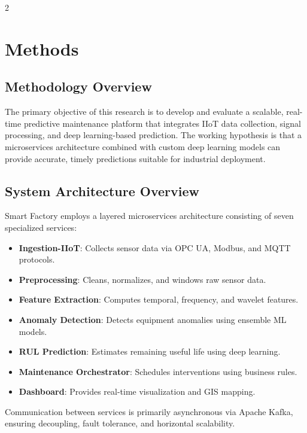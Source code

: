 \documentclass{ijceds} %
\begin{document}
\begin{multicols}{2}


\section{Methods}
\label{sec:methods}

\subsection{Methodology Overview}

The primary objective of this research is to develop and evaluate a scalable, real-time predictive maintenance platform that integrates IIoT data collection, signal processing, and deep learning-based prediction. The working hypothesis is that a microservices architecture combined with custom deep learning models can provide accurate, timely predictions suitable for industrial deployment.

\subsection{System Architecture Overview}

Smart Factory employs a layered microservices architecture consisting of seven specialized services:

\begin{itemize}
    \item \textbf{Ingestion-IIoT}: Collects sensor data via OPC UA, Modbus, and MQTT protocols.
    \item \textbf{Preprocessing}: Cleans, normalizes, and windows raw sensor data.
    \item \textbf{Feature Extraction}: Computes temporal, frequency, and wavelet features.
    \item \textbf{Anomaly Detection}: Detects equipment anomalies using ensemble ML models.
    \item \textbf{RUL Prediction}: Estimates remaining useful life using deep learning.
    \item \textbf{Maintenance Orchestrator}: Schedules interventions using business rules.
    \item \textbf{Dashboard}: Provides real-time visualization and GIS mapping.
\end{itemize}

Communication between services is primarily asynchronous via Apache Kafka, ensuring decoupling, fault tolerance, and horizontal scalability.


\end{multicols}
\end{document}
